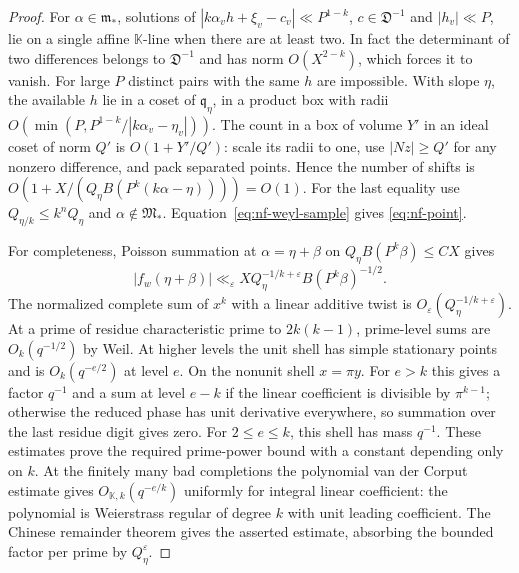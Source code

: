 \documentclass[11pt,letterpaper]{article}
\theoremstyle{definition}
\numberwithin{equation}{section}
\begin{document}
\begin{proof}
For $\alpha\in\mathfrak m_*$, solutions of
$|k\alpha_v h+\xi_v-c_v|\ll P^{1-k}$,
$c\in\mathfrak D^{-1}$ and $|h_v|\ll P$, lie on a single affine
$\mathbb K$-line when there are at least two. In fact the determinant
of two differences belongs to $\mathfrak D^{-1}$ and has norm
$O(X^{2-k})$, which forces it to vanish. For large $P$ distinct pairs
with the same $h$ are impossible. With slope $\eta$, the available
$h$ lie in a coset of $\mathfrak q_\eta$, in a product box with
radii $O(\min(P,P^{1-k}/|k\alpha_v-\eta_v|))$.
The count in a box of volume $Y'$ in an ideal coset of norm $Q'$
is $O(1+Y'/Q')$: scale its radii to one, use $|Nz|\ge Q'$ for any
nonzero difference, and pack separated points. Hence the number
of shifts is $O(1+X/(Q_\eta B(P^k(k\alpha-\eta))))=O(1)$.
For the last equality use $Q_{\eta/k}\le k^nQ_\eta$ and
$\alpha\notin\mathfrak M_*$. Equation~\eqref{eq:nf-weyl-sample}
gives \eqref{eq:nf-point}.

For completeness, Poisson summation at $\alpha=\eta+\beta$ on
$Q_\eta B(P^k\beta)\le CX$ gives
\begin{equation}\label{eq:nf-complete-bound}
 |f_w(\eta+\beta)|\ll_{\varepsilon}
 X Q_\eta^{-1/k+\varepsilon} B(P^k\beta)^{-1/2}.
\end{equation}
The normalized complete sum of $x^k$ with a linear additive twist
is $O_\varepsilon(Q_\eta^{-1/k+\varepsilon})$. At a prime of residue
characteristic prime to $2k(k-1)$, prime-level sums are $O_k(q^{-1/2})$
by Weil. At higher levels the unit shell has simple stationary points
and is $O_k(q^{-e/2})$ at level $e$. On the nonunit shell $x=\pi y$.
For $e>k$ this gives a factor $q^{-1}$ and a sum at level $e-k$
if the linear coefficient is divisible by $\pi^{k-1}$; otherwise
the reduced phase has unit derivative everywhere, so summation over
the last residue digit gives zero. For $2\le e\le k$, this shell
has mass $q^{-1}$. These estimates prove the required prime-power bound
with a constant depending only on $k$. At the finitely many bad
completions the polynomial van der Corput estimate
\cite[Corollary~3.4]{NFCluckers} gives $O_{\mathbb K,k}(q^{-e/k})$
uniformly for integral linear coefficient: the polynomial is
Weierstrass regular of degree $k$ with unit leading coefficient.
The Chinese remainder theorem gives the asserted estimate, absorbing
the bounded factor per prime by $Q_\eta^\varepsilon$.


\end{proof}
\end{document}
